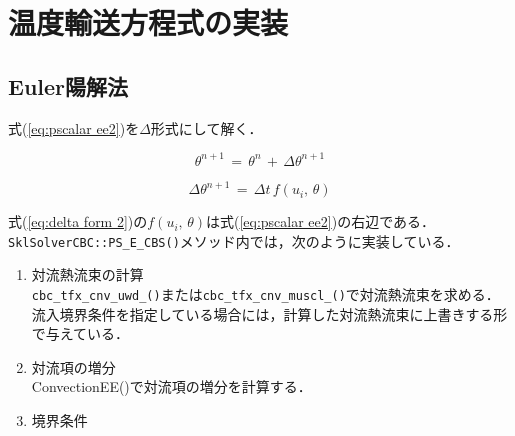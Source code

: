%
\section{温度輸送方程式の実装}
\subsection{Euler陽解法}
式(\ref{eq:pscalar ee2})を$\Delta$形式にして解く．

\begin{equation}
\theta^{n+1} \,=\, \theta^{n} \,+\, \Delta \theta^{n+1}
\label{eq:delta form 1}
\end{equation}

\begin{equation}
\Delta \theta^{n+1} \,=\, \Delta t \, f \left( u_{i}, \, \theta \right)
\label{eq:delta form 2}
\end{equation}

式(\ref{eq:delta form 2})の$f \left( u_{i}, \, \theta \right)$は式(\ref{eq:pscalar ee2})の右辺である．
\verb|SklSolverCBC::PS_E_CBS()|メソッド内では，次のように実装している．

\begin{enumerate}
\item 対流熱流束の計算\\
\verb|cbc_tfx_cnv_uwd_()|または\verb|cbc_tfx_cnv_muscl_()|で対流熱流束を求める．流入境界条件を指定している場合には，計算した対流熱流束に上書きする形で与えている．
\item 対流項の増分\\
ConvectionEE()で対流項の増分を計算する．
\item 境界条件\\

\end{enumerate}




